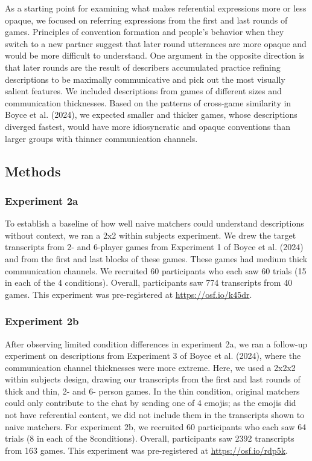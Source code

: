 \documentclass[10pt, letterpaper]{article}
\begin{document}
As a starting point for examining what makes referential expressions
more or less opaque, we focused on referring expressions from the first
and last rounds of games. Principles of convention formation and
people's behavior when they switch to a new partner suggest that later
round utterances are more opaque and would be more difficult to
understand. One argument in the opposite direction is that later rounds
are the result of describers accumulated practice refining descriptions
to be maximally communicative and pick out the most visually salient
features. We included descriptions from games of different sizes and
communication thicknesses. Based on the patterns of cross-game
similarity in Boyce et al. (2024), we expected smaller and thicker
games, whose descriptions diverged fastest, would have more
idiosyncratic and opaque conventions than larger groups with thinner
communication channels.

\subsection{Methods}\label{methods-1}

\subsubsection{Experiment 2a}\label{experiment-2a}

To establish a baseline of how well naive matchers could understand
descriptions without context, we ran a 2x2 within subjects experiment.
We drew the target transcripts from 2- and 6-player games from
Experiment 1 of Boyce et al. (2024) and from the first and last blocks
of these games. These games had medium thick communication channels. We
recruited 60 participants who each saw 60 trials (15 in each of the 4
conditions). Overall, participants saw 774 transcripts from 40 games.
This experiment was pre-registered at \url{https://osf.io/k45dr}.

\subsubsection{Experiment 2b}\label{experiment-2b}

After observing limited condition differences in experiment 2a, we ran a
follow-up experiment on descriptions from Experiment 3 of Boyce et al.
(2024), where the communication channel thicknesses were more extreme.
Here, we used a 2x2x2 within subjects design, drawing our transcripts
from the first and last rounds of thick and thin, 2- and 6- person
games. In the thin condition, original matchers could only contribute to
the chat by sending one of 4 emojis; as the emojis did not have
referential content, we did not include them in the transcripts shown to
naive matchers. For experiment 2b, we recruited 60 participants who each
saw 64 trials (8 in each of the 8conditions). Overall, participants saw
2392 transcripts from 163 games. This experiment was pre-registered at
\url{https://osf.io/rdp5k}.
\end{document}
